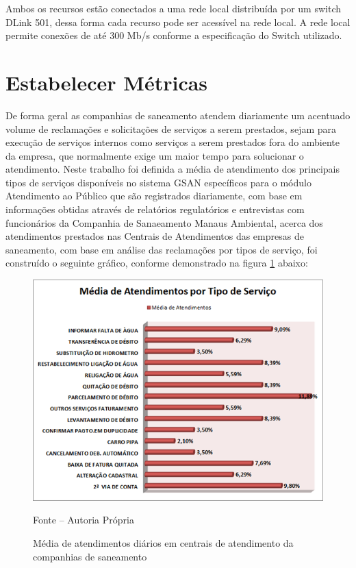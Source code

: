 Ambos os recursos estão conectados a uma rede local distribuída por um switch DLink 501, dessa forma cada recurso pode ser acessível na rede local. A rede local permite conexões de até 300 Mb/s conforme a especificação do Switch utilizado.


\section{Estabelecer Métricas}
De forma geral as companhias de saneamento atendem diariamente um acentuado volume de reclamações e solicitações de serviços a serem prestados, sejam para execução de serviços internos como serviços a serem prestados fora do ambiente da empresa, que normalmente exige um maior tempo para solucionar o atendimento.
Neste trabalho foi definida a média de atendimento dos principais tipos de serviços disponíveis no sistema GSAN específicos para o módulo Atendimento ao Público que são registrados diariamente, com base em informações obtidas através de relatórios regulatórios e entrevistas com funcionários da Companhia de Sanaeamento Manaus Ambiental, acerca dos atendimentos prestados nas Centrais de Atendimentos das empresas de saneamento, com base em análise das reclamações por tipos de serviço, foi construído o seguinte gráfico, conforme demonstrado na figura \ref{figura:mediaAtendimentos} abaixo:

\begin{figure}[!htb]
	\centering
	\includegraphics{figuras/media_atendimentos.png}
	\caption{Média de atendimentos diários em centrais de atendimento da companhias de saneamento}	
	\label{figura:mediaAtendimentos}
	Fonte – Autoria Própria
\end{figure}


